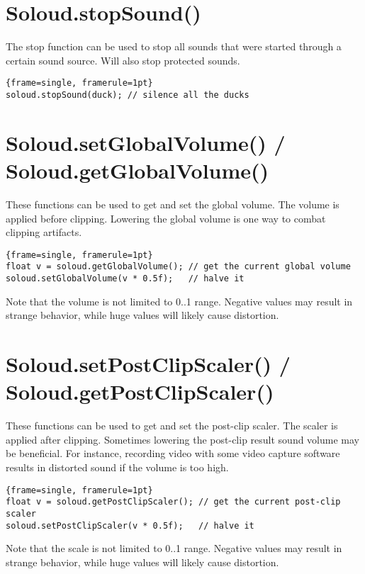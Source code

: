 \section{Soloud.stopSound()}

The stop function can be used to stop all sounds that were started through a certain sound source. Will also stop protected sounds.

\begin{lstlisting}{frame=single, framerule=1pt}
soloud.stopSound(duck); // silence all the ducks
\end{lstlisting}

\section{Soloud.setGlobalVolume() / Soloud.getGlobalVolume()}

These functions can be used to get and set the global volume. The volume is applied before clipping. Lowering the global volume is one way to combat clipping artifacts.

\begin{lstlisting}{frame=single, framerule=1pt}
float v = soloud.getGlobalVolume(); // get the current global volume
soloud.setGlobalVolume(v * 0.5f);   // halve it
\end{lstlisting}

Note that the volume is not limited to 0..1 range. Negative values may result in strange behavior, while huge values will likely cause distortion.

\section{Soloud.setPostClipScaler() / Soloud.getPostClipScaler()}

These functions can be used to get and set the post-clip scaler. The scaler is applied after clipping. Sometimes lowering the post-clip result sound volume may be beneficial. For instance, recording video with some video capture software results in distorted sound if the volume is too high.

\begin{lstlisting}{frame=single, framerule=1pt}
float v = soloud.getPostClipScaler(); // get the current post-clip scaler
soloud.setPostClipScaler(v * 0.5f);   // halve it
\end{lstlisting}

Note that the scale is not limited to 0..1 range. Negative values may result in strange behavior, while huge values will likely cause distortion.